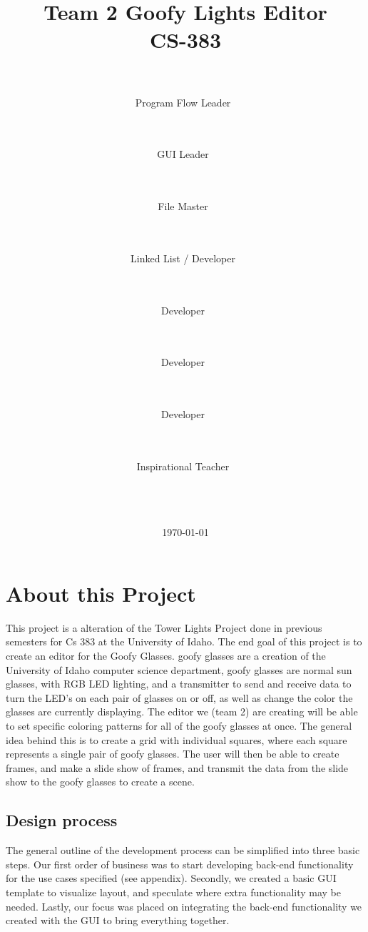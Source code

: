 \documentclass[11pt]{article} %
\title{
	{\Huge Team 2 Goofy Lights Editor}
	\\
	{\Large CS-383}}
\author{
	\\
	\makebox[.3\linewidth]{Nick Krenowicz}\\Program Flow Leader\ \and
	\\
	\makebox[.3\linewidth]{Paul Martin}\\GUI Leader\ \and
	\\
	\makebox[.3\linewidth]{Tim Sonnen}\\File Master\ \and
	\\
	\makebox[.3\linewidth]{Kevin Dorscher}\\Linked List / Developer\ \and
	\\
	\makebox[.3\linewidth]{Joe Carter}\\Developer\ \and
	\\
	\makebox[.3\linewidth]{Lise Welch}\\Developer\ \and
	\\
	\makebox[.3\linewidth]{Emma Bateman}\\Developer\ \and
	\\
	\makebox[.3\linewidth]{Bruce Bolden}\\Inspirational Teacher\ %
	\\
	\\
	\\
	\\}
\date{\today} %
\begin{document}
\lstset{language=C++}
\maketitle
\pagebreak

\tableofcontents
\newpage %


\section{About this Project}
This project is a alteration of the Tower Lights Project done in previous semesters for Cs 383 at the University of Idaho. The end goal of this project is to create an editor for the Goofy Glasses. goofy glasses are a creation of the University of Idaho computer science department, goofy glasses are normal sun glasses, with RGB LED lighting, and a transmitter to send and receive data to turn the LED's on each pair of glasses on or off, as well as change the color the glasses are currently displaying. The editor we (team 2) are creating will be able to set specific coloring patterns for all of the goofy glasses at once. The general idea behind this is to create a grid with individual squares, where each square represents a single pair of goofy glasses. The user will then be able to create frames, and make a slide show of frames, and transmit the data from the slide show to the goofy glasses to create a scene. 

\subsection{Design process}
The general outline of the development process can be simplified into three basic steps. Our first order of business was to start developing back-end functionality for the use cases specified (see appendix). Secondly, we created a basic GUI template to visualize layout, and speculate where extra functionality may be needed. Lastly, our focus was placed on integrating the back-end functionality we created with the GUI to bring everything together.
\end{document}
